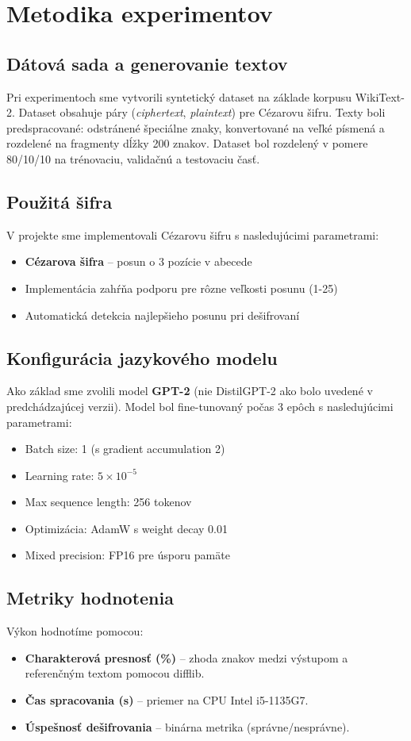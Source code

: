 \documentclass[12pt,a4paper]{article}
\begin{document}
\section{Metodika experimentov}
\subsection{Dátová sada a generovanie textov}
Pri experimentoch sme vytvorili syntetický dataset na základe korpusu WikiText-2. Dataset obsahuje páry (\textit{ciphertext}, \textit{plaintext}) pre Cézarovu šifru. Texty boli predspracované: odstránené špeciálne znaky, konvertované na veľké písmená a rozdelené na fragmenty dĺžky 200 znakov. Dataset bol rozdelený v pomere 80/10/10 na trénovaciu, validačnú a testovaciu časť.

\subsection{Použitá šifra}
V projekte sme implementovali Cézarovu šifru s nasledujúcimi parametrami:
\begin{itemize}
    \item \textbf{Cézarova šifra} -- posun o 3 pozície v abecede
    \item Implementácia zahŕňa podporu pre rôzne veľkosti posunu (1-25)
    \item Automatická detekcia najlepšieho posunu pri dešifrovaní
\end{itemize}

\subsection{Konfigurácia jazykového modelu}
Ako základ sme zvolili model \textbf{GPT-2} (nie DistilGPT-2 ako bolo uvedené v predchádzajúcej verzii). Model bol fine-tunovaný počas 3 epôch s nasledujúcimi parametrami:
\begin{itemize}
    \item Batch size: 1 (s gradient accumulation 2)
    \item Learning rate: \(5\times10^{-5}\)
    \item Max sequence length: 256 tokenov
    \item Optimizácia: AdamW s weight decay 0.01
    \item Mixed precision: FP16 pre úsporu pamäte
\end{itemize}

\subsection{Metriky hodnotenia}
Výkon hodnotíme pomocou:
\begin{itemize}
    \item \textbf{Charakterová presnosť (\%)} – zhoda znakov medzi výstupom a referenčným textom pomocou difflib.
    \item \textbf{Čas spracovania (s)} – priemer na CPU Intel i5-1135G7.
    \item \textbf{Úspešnosť dešifrovania} – binárna metrika (správne/nesprávne).
\end{itemize}
\end{document}
